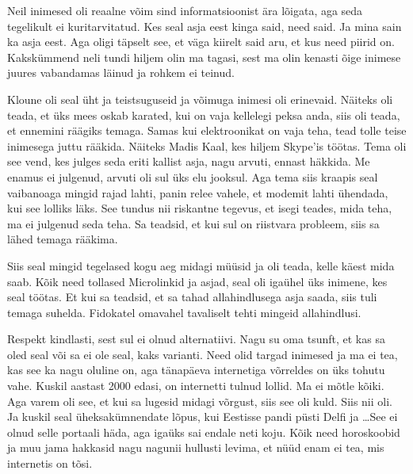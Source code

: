 
Neil inimesed oli reaalne võim sind informatsioonist ära lõigata, aga seda 
tegelikult ei kuritarvitatud. Kes seal asja eest kinga said, need said. Ja mina 
sain ka asja eest. Aga oligi täpselt see, et väga kiirelt said aru, et kus need 
piirid on. Kakskümmend neli tundi hiljem olin ma tagasi, sest ma olin kenasti 
õige inimese juures vabandamas läinud ja rohkem ei teinud. 

Kloune oli seal üht ja teistsuguseid ja võimuga inimesi oli erinevaid. Näiteks  
oli teada, et üks mees oskab karated, kui on vaja kellelegi peksa anda, siis 
oli teada, et ennemini räägiks temaga. Samas kui elektroonikat on vaja teha, 
tead tolle teise inimesega juttu rääkida. Näiteks Madis Kaal, kes hiljem Skype'is töötas. Tema oli see vend, kes julges seda eriti 
kallist asja, nagu arvuti, ennast häkkida. Me enamus ei julgenud, arvuti oli 
sul üks elu jooksul. Aga tema siis kraapis seal vaibanoaga mingid rajad lahti, 
panin relee vahele, et modemit lahti ühendada, kui see lolliks läks. See tundus 
nii riskantne tegevus, et isegi teades, mida teha, ma ei julgenud seda teha. Sa 
teadsid, et kui sul on riistvara probleem, siis sa lähed temaga rääkima. 

Siis seal mingid tegelased kogu aeg midagi müüsid ja oli teada, kelle käest 
mida saab. Kõik need tollased Microlinkid ja asjad,  seal oli igaühel  üks 
inimene, kes seal töötas. Et kui sa teadsid, et sa tahad allahindlusega asja 
saada,  siis tuli temaga suhelda. Fidokatel omavahel tavaliselt tehti mingeid 
allahindlusi. 


Respekt kindlasti, sest sul ei olnud alternatiivi. Nagu su oma tsunft, et kas 
sa oled seal või sa ei ole seal, kaks varianti. Need olid targad inimesed ja ma 
ei tea, kas see  ka nagu oluline on, aga tänapäeva internetiga võrreldes on üks 
tohutu vahe. Kuskil aastast 2000 edasi, on internetti tulnud lollid. Ma ei 
mõtle kõiki. Aga varem oli see, et kui sa lugesid midagi võrgust, siis see oli 
kuld. Siis nii oli. Ja kuskil seal üheksakümnendate lõpus, kui Eestisse pandi 
püsti Delfi ja \ldots See ei olnud  selle portaali häda, aga igaüks sai endale 
neti koju. Kõik need horoskoobid ja muu jama hakkasid nagu nagunii hullusti 
levima, et nüüd enam ei tea, mis internetis on tõsi. 

